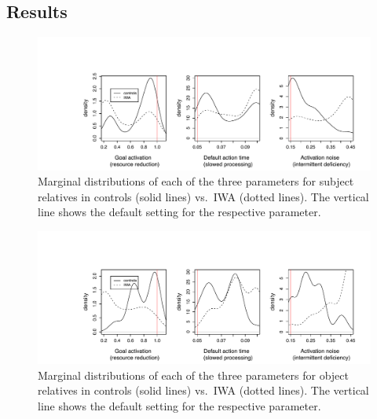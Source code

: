 \documentclass{cambridge7A}\usepackage[]{graphicx}\usepackage[]{color}
\begin{document}
\subsection{Results}

\begin{figure}
  \centering
  \includegraphics[width=\columnwidth]{figures/margSR.pdf}
  \caption{Marginal distributions of each of the three parameters for subject relatives in controls (solid lines) vs.\ IWA (dotted lines). The vertical line shows the default setting for the respective parameter.}
  \label{fig:margSR}
\end{figure}

\begin{figure}
  \centering
  \includegraphics[width=\columnwidth]{figures/margOR.pdf}
  \caption{Marginal distributions of each of the three parameters for object relatives in controls (solid lines) vs.\ IWA (dotted lines). The vertical line shows the default setting for the respective parameter.}
  \label{fig:margOR}
\end{figure}
\end{document}

